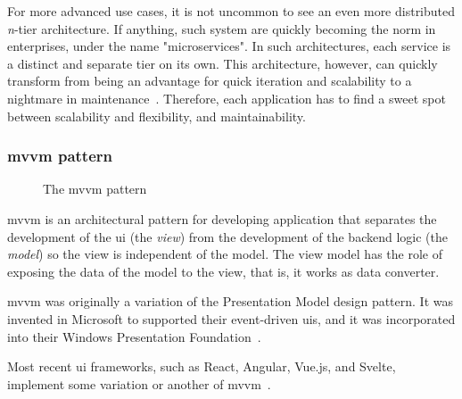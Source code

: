 \begin{toexclude}
  For more advanced use cases, it is not uncommon to see an even more distributed \emph{n}-tier architecture.
  If anything, such system are quickly becoming the norm in enterprises, under the name "microservices".
  In such architectures, each service is a distinct and separate tier on its own.
  This architecture, however, can quickly transform from being an advantage for quick iteration and scalability to a nightmare in maintenance~\autocite{pautasso_microservices_2017}.
  Therefore, each application has to find a sweet spot between scalability and flexibility, and maintainability.

  \subsubsection{\acrshort{mvvm} pattern}

  \begin{figure}[H]
    \centerfloat
    \sffamily

    \caption{The \acrshort{mvvm} pattern}
    \label{fig:mvvm-arch}
  \end{figure}

  \acrfull{mvvm} is an architectural pattern for developing application that separates the development of the \acrfull{ui} (the \emph{view}) from the development of the backend logic (the \emph{model}) so the view is independent of the model.
  The view model has the role of exposing the data of the model to the view, that is, it works as data converter.

  \acrshort{mvvm} was originally a variation of the Presentation Model design pattern. It was invented in Microsoft to supported their event-driven \acrshort{ui}s, and it was incorporated into their Windows Presentation Foundation~\autocite{smith_patterns_2009}.

  Most recent \acrshort{ui} frameworks, such as React, Angular, Vue.js, and Svelte, implement some variation or another of \acrshort{mvvm}~\autocite{noauthor_javascript_nodate}.


\end{toexclude}
